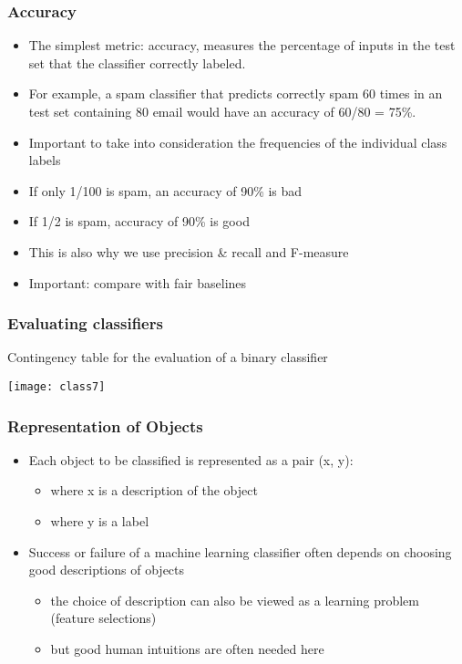 \begin{frame}[fragile]
  \frametitle{Accuracy}
\begin{itemize}
\item The simplest metric: accuracy, measures the percentage of inputs in the test set that the classifier correctly labeled. 
\item For example, a spam classifier that predicts correctly spam 60 times in an test set containing 80 email would have an accuracy of 60/80 = 75\%. 
\item Important to take into consideration the frequencies of the individual class labels 
\item If only 1/100 is spam, an accuracy of 90\% is bad
\item If 1/2 is spam, accuracy of 90\% is good
\item This is also why we use precision \& recall and F-measure
\item Important: compare with fair baselines 


\end{itemize}
\end{frame}

\begin{frame}[fragile]
  \frametitle{Evaluating classifiers}
Contingency table for the evaluation of a binary classifier
\begin{center}
\texttt{[image: class7]}
\end{center}
\end{frame}



\begin{frame}[fragile]
  \frametitle{Representation of Objects}
\begin{itemize}
\item Each object to be classified is represented as a pair (x, y):
\begin{itemize}
\item where x is a description of the object
\item where y is a label
\end{itemize}
\item Success or failure of a machine learning classifier often depends on choosing good descriptions of objects
\begin{itemize}
\item the choice of description can also be viewed as a learning problem (feature selections)
\item but good human intuitions are often needed here
\end{itemize}
\end{itemize}
\end{frame}


